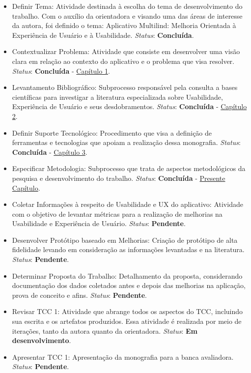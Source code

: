 \begin{itemize}
	\item Definir Tema: Atividade destinada à escolha do tema de desenvolvimento do trabalho. Com o auxílio da orientadora e visando uma das áreas de interesse da autora, foi definido o tema: Aplicativo Multilind: Melhoria Orientada à
	Experiência de Usuário e à Usabilidade. \textit{Status}: \textbf{Concluída}.
	\item Contextualizar Problema: Atividade que consiste em desenvolver uma visão clara em relação ao contexto do aplicativo e o problema que visa resolver. \textit{Status}: \textbf{Concluída} - \hyperref[chap:Introducao]{Capítulo 1}.
	\item Levantamento Bibliográfico: Subprocesso responsável pela consulta a bases científicas para investigar a literatura especializada sobre Usabilidade, Experiência de Usuário e seus desdobramentos. \textit{Status}: \textbf{Concluída} - \hyperref[chap:Referencial]{Capítulo 2}.
	\item Definir Suporte Tecnológico: Procedimento que visa a definição de ferramentas e tecnologias que apoiam a realização dessa monografia. \textit{Status}: \textbf{Concluída} - \hyperref[chap:ReferencialTech]{Capítulo 3}.
	\item Especificar Metodologia: Subprocesso que trata de aspectos metodológicos da pesquisa e desenvolvimento do trabalho. \textit{Status}: \textbf{Concluída} - \hyperref[chap:Metodologia]{Presente Capítulo}.
	\item Coletar Informações à respeito de Usabilidade e UX do aplicativo: Atividade com o objetivo de levantar métricas para a realização de melhorias na Usabilidade e Experiência de Usuário. \textit{Status}: \textbf{Pendente}.
	\item Desenvolver Protótipo baseado em Melhorias: Criação de protótipo de alta fidelidade levando em consideração as informações levantadas e na literatura. \textit{Status}: \textbf{Pendente}.
	\item Determinar Proposta do Trabalho: Detalhamento da proposta, considerando documentação dos dados coletados antes e depois das melhorias na aplicação, prova de conceito e afins. \textit{Status}: \textbf{Pendente}.
	\item Revisar TCC 1: Atividade que abrange todos os aspectos do TCC, incluindo sua escrita e os artefatos produzidos. Essa atividade é realizada por meio de iterações, tanto da autora quanto da orientadora. \textit{Status}: \textbf{Em desenvolvimento}.
	\item Apresentar TCC 1: Apresentação da monografia para a banca avaliadora. \textit{Status}: \textbf{Pendente}.
\end{itemize}
